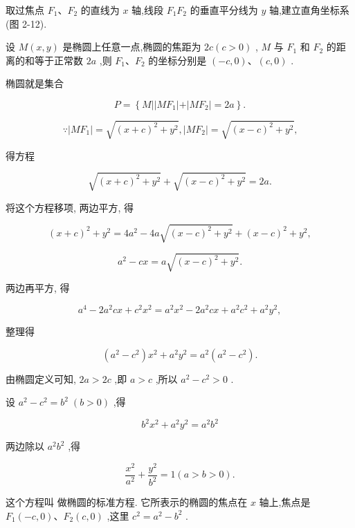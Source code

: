 \documentclass[lang=cn,newtx,10pt,scheme=chinese]{elegantbook}
\begin{document}
取过焦点 \({F}_{1}\text{、}{F}_{2}\) 的直线为 \(x\) 轴,线段 \({F}_{1}{F}_{2}\) 的垂直平分线为 \(y\) 轴,建立直角坐标系 (图 2-12).

设 \(M\left( {x,y}\right)\) 是椭圆上任意一点,椭圆的焦距为 \({2c}\left( {c > 0}\right)\) , \(M\) 与 \({F}_{1}\) 和 \({F}_{2}\) 的距离的和等于正常数 \({2a}\) ,则 \({F}_{1}\text{、}{F}_{2}\) 的坐标分别是 \(\left( {-c,0}\right) \text{、}\left( {c,0}\right)\) .

椭圆就是集合

\[
  P = \left\{ {M\left| \right| M{F}_{1}\left| +\right| M{F}_{2} \mid = {2a}}\right\} .
\]

\[
  \because \left| {M{F}_{1}}\right| = \sqrt{{\left( x + c\right) }^{2} + {y}^{2}},\left| {M{F}_{2}}\right| = \sqrt{{\left( x - c\right) }^{2} + {y}^{2}}\text{,}
\]

得方程

\[
  \sqrt{{\left( x + c\right) }^{2} + {y}^{2}} + \sqrt{{\left( x - c\right) }^{2} + {y}^{2}} = {2a}.
\]

将这个方程移项, 两边平方, 得

\[
    {\left( x + c\right) }^{2} + {y}^{2} = 4{a}^{2} - {4a}\sqrt{{\left( x - c\right) }^{2} + {y}^{2}} + {\left( x - c\right) }^{2} + {y}^{2},
\]

\[
    {a}^{2} - {cx} = a\sqrt{{\left( x - c\right) }^{2} + {y}^{2}}.
\]

两边再平方, 得

\[
    {a}^{4} - 2{a}^{2}{cx} + {c}^{2}{x}^{2} = {a}^{2}{x}^{2} - 2{a}^{2}{cx} + {a}^{2}{c}^{2} + {a}^{2}{y}^{2},
\]

整理得

\[
  \left( {{a}^{2} - {c}^{2}}\right) {x}^{2} + {a}^{2}{y}^{2} = {a}^{2}\left( {{a}^{2} - {c}^{2}}\right) .
\]

由椭圆定义可知, \({2a} > {2c}\) ,即 \(a > c\) ,所以 \({a}^{2} - {c}^{2} > 0\) .

设 \({a}^{2} - {c}^{2} = {b}^{2}\;\left( {b > 0}\right)\) ,得

\[
    {b}^{2}{x}^{2} + {a}^{2}{y}^{2} = {a}^{2}{b}^{2}
\]

两边除以 \({a}^{2}{b}^{2}\) ,得

\[
  \frac{{x}^{2}}{{a}^{2}} + \frac{{y}^{2}}{{b}^{2}} = 1\left( {a > b > 0}\right) . \tag{1}
\]

这个方程叫 做椭圆的标准方程. 它所表示的椭圆的焦点在 \(x\) 轴上,焦点是 \({F}_{1}\left( {-c,0}\right) \text{、}{F}_{2}\left( {c,0}\right)\) ,这里 \({c}^{2} = {a}^{2} - {b}^{2}\) .
\end{document}
